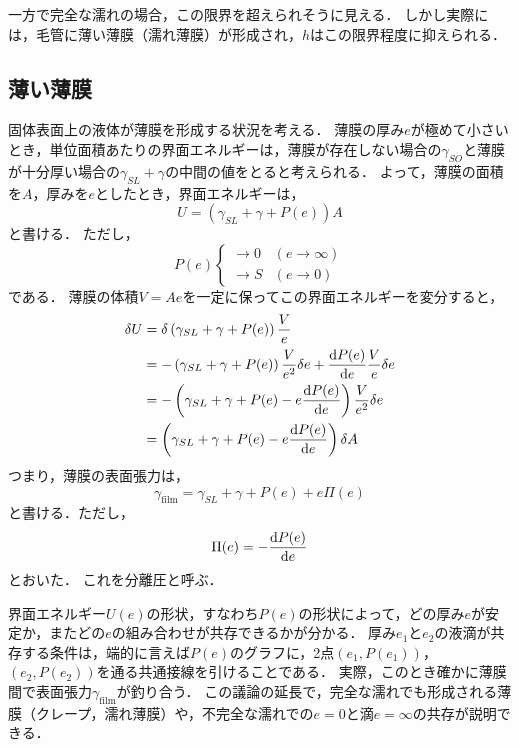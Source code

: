 \documentclass[a4paper,11pt]{jsarticle}
\begin{document}
一方で完全な濡れの場合，この限界を超えられそうに見える．
しかし実際には，毛管に薄い薄膜（濡れ薄膜）が形成され，$h$はこの限界程度に抑えられる．

\subsection{薄い薄膜}
固体表面上の液体が薄膜を形成する状況を考える．
薄膜の厚み$e$が極めて小さいとき，単位面積あたりの界面エネルギーは，薄膜が存在しない場合の$\gamma_{SO}$と薄膜が十分厚い場合の$\gamma_{SL}+\gamma$の中間の値をとると考えられる．
よって，薄膜の面積を$A$，厚みを$e$としたとき，界面エネルギーは，
\begin{equation}
  U = \left(\gamma_{SL} + \gamma + P(e)\right)A
\end{equation}
と書ける．
ただし，
\begin{equation}
  P(e)
  \begin{cases}
    \to 0 & \left(e \to \infty\right)\\
    \to S & \left(e \to 0\right) 
  \end{cases}
\end{equation}
である．
薄膜の体積$V=Ae$を一定に保ってこの界面エネルギーを変分すると，
\begin{align}
  \delta U &= \delta \left(\gamma_{SL} + \gamma + P(e)\right)\frac{V}{e} \notag\\
  &= -\left(\gamma_{SL} + \gamma + P(e)\right)\frac{V}{e^2}\delta e + \dv{P(e)}{e}\frac{V}{e}\delta e \notag\\
  &= -\left(\gamma_{SL} + \gamma + P(e) -e\dv{P(e)}{e}\right)\frac{V}{e^2}\delta e \notag\\
  &= \left(\gamma_{SL} + \gamma + P(e) -e\dv{P(e)}{e}\right)\delta A
\end{align}
つまり，薄膜の表面張力は，
\begin{equation}
  \gamma_{\mathrm{film}} = \gamma_{SL} + \gamma + P(e) + e\Pi(e)
\end{equation}
と書ける．ただし，
\begin{equation}
  \Pi(e) = - \dv{P(e)}{e}
\end{equation}
とおいた．
これを分離圧と呼ぶ．

界面エネルギー$U(e)$の形状，すなわち$P(e)$の形状によって，どの厚み$e$が安定か，またどの$e$の組み合わせが共存できるかが分かる．
厚み$e_1$と$e_2$の液滴が共存する条件は，端的に言えば$P(e)$のグラフに，2点$(e_1,P(e_1))$，$(e_2,P(e_2))$を通る共通接線を引けることである．
実際，このとき確かに薄膜間で表面張力$\gamma_{\mathrm{film}}$が釣り合う．
この議論の延長で，完全な濡れでも形成される薄膜（クレープ，濡れ薄膜）や，不完全な濡れでの$e=0$と滴$e=\infty$の共存が説明できる．
\end{document}
